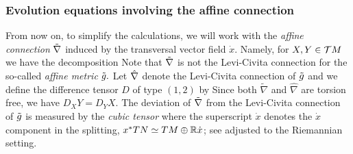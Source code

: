 \subsubsection{Evolution equations involving the affine connection}

From now on, to simplify the calculations, we will work with the {\it{affine connection}} $\~\n$ induced by the transversal vector field $\dot{x}.$ Namely, for $X,Y\in\mc{T}M$ we have the decomposition
Note that $\~\n$ is not the Levi-Civita connection for the so-called {\it{affine metric}} $\~g.$ Let $\hat{\n}$ denote the Levi-Civita connection of $\~g$ and we define the difference tensor $D$ of type $(1,2)$ by
Since both $\tilde{\nabla}$ and $\hat{\nabla}$ are torsion free, we have $D_XY=D_YX.$
The deviation of $\~\n$ from the Levi-Civita connection of $\~g$ is measured by the {\it{cubic tensor}}
where the superscript $\dot{x}$ denotes the $\dot{x}$ component in the splitting, $x^{\ast} TN \simeq TM \oplus \R \dot{x}$;
see \cite[Prop.~4.1]{NomizuSasaki:/1994} adjusted to the Riemannian setting.

